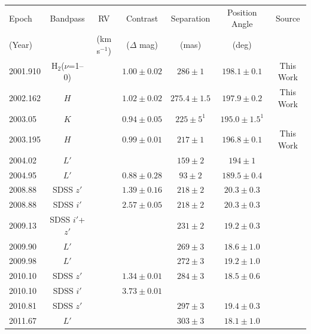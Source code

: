 \begin{landscape}
\begin{table}[hbt!]
\scriptsize
\begin{center}
\begin{tabular}{lcccccc}
\hline
Epoch & Bandpass & RV & Contrast & Separation & Position Angle & Source \\
(Year) &   & (km s$^{-1}$) &  ($\Delta$ mag) & (mas) & (deg) & \\
\hline
2001.910 & H$_2$($\nu$=1--0) & & $1.00 \pm 0.02$ & $286  \pm 1$   & $198.1 \pm 0.1$   & This Work \\
2002.162 & $H$               & & $1.02 \pm 0.02$ & $275.4\pm 1.5$ & $197.9 \pm 0.2$   & This Work \\
2003.05  & $K$              &  & $0.94 \pm 0.05$ & $225  \pm 5^{1}$   & $195.0 \pm 1.5^{1}$   & \citet{Kasper07} \\
2003.195 & $H$              &  & $0.99 \pm 0.01$ & $217  \pm 1$   & $196.8 \pm 0.1$   & This Work \\
2004.02  & $L'$              & & & $159  \pm 2$   & $194   \pm 1$     & \citet{Delorme12} \\
2004.95  & $L'$              & & $0.88 \pm 0.28$ & $93   \pm 2$   & $189.5 \pm 0.4$   & \citet{Kasper07} \\
2008.88  & SDSS $z'$       &   & $1.39\pm 0.16$ & $218  \pm 2$   & $20.3  \pm 0.3$   & \citet{Bergfors10} \\
2008.88  & SDSS $i'$        &  & $2.57\pm 0.05$ & $218  \pm 2$   & $20.3  \pm 0.3$   & \citet{Bergfors10} \\
2009.13  & SDSS $i'$+$z'$    & &                & $231  \pm 2$   & $19.2  \pm 0.3$   & \citet{Janson12} \\
2009.90  &  $L'$             &   &              & $269  \pm 3$   & $18.6  \pm 1.0$   & \citet{Delorme12} \\
2009.98  &  $L'$             &    &             & $272  \pm 3$   & $19.2  \pm 1.0$   & \citet{Delorme12} \\
2010.10  & SDSS $z'$       &   & $1.34\pm 0.01$ & $284  \pm 3$   & $18.5  \pm 0.6$   & \citet{Janson12} \\
2010.10  & SDSS $i'$       &   & $3.73\pm 0.01$ &                &                   & \citet{Janson12} \\
2010.81  & SDSS $z'$       &   &                & $297  \pm 3$   & $19.4  \pm 0.3$   & \citet{Janson14a} \\
2011.67  &  $L'$             &    &             & $303  \pm 3$   & $18.1  \pm 1.0$   & \citet{Delorme12} \\

\end{tabular}
\end{center}
\end{table}
\end{landscape}
